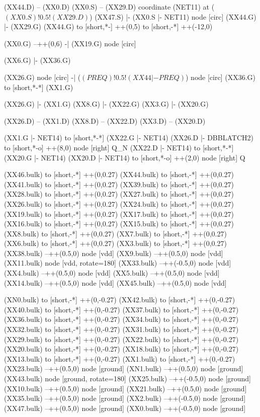 \begin{circuitikz}[american]
	(XX44.D) -- (XX0.D)
	(XX0.S) -- (XX29.D)
	coordinate (NET11) at ($(XX0.S)!0.5!(XX29.D)$)
	(XX47.S) |- (XX0.S |- NET11) node [circ] {}
	(XX44.G) |- (XX29.G)
	(XX44.G) to [short,*-] ++(0,5) to [short,-*] ++(-12,0)
	
	(XX0.G) --++(0,6) -| (XX19.G) node [circ] {}
	
	(XX6.G) |- (XX36.G)
	
	(XX26.G) node [circ] {} -| ($(PREQ)!0.5!(XX44 |- PREQ)$) node [circ] {}
	(XX36.G) to [short,*-*] (XX1.G)	
	
	(XX26.G) |- (XX1.G)
	(XX8.G) |- (XX22.G)
	(XX3.G) |- (XX20.G)
	
	(XX26.D) -- (XX1.D)
	(XX8.D) -- (XX22.D)
	(XX3.D) -- (XX20.D)
	
	(XX1.G |- NET14) to [short,*-*] (XX22.G |- NET14)
	(XX26.D |- DBBLATCH2) to [short,*-o] ++(8,0) node [right] {Q\_N}
	(XX22.D |- NET14) to [short,*-*] (XX20.G |- NET14)
	(XX20.D |- NET14) to [short,*-o] ++(2,0) node [right] {Q}
	
	(XX46.bulk) to [short,-*] ++(0,0.27)
	(XX44.bulk) to [short,-*] ++(0,0.27)
	(XX41.bulk) to [short,-*] ++(0,0.27)
	(XX39.bulk) to [short,-*] ++(0,0.27)
	(XX28.bulk) to [short,-*] ++(0,0.27)
	(XX27.bulk) to [short,-*] ++(0,0.27)
	(XX26.bulk) to [short,-*] ++(0,0.27)
	(XX24.bulk) to [short,-*] ++(0,0.27)
	(XX19.bulk) to [short,-*] ++(0,0.27)
	(XX17.bulk) to [short,-*] ++(0,0.27)
	(XX16.bulk) to [short,-*] ++(0,0.27)
	(XX15.bulk) to [short,-*] ++(0,0.27)
	(XX8.bulk) to [short,-*] ++(0,0.27)
	(XX7.bulk) to [short,-*] ++(0,0.27)
	(XX6.bulk) to [short,-*] ++(0,0.27)
	(XX3.bulk) to [short,-*] ++(0,0.27)
	(XX38.bulk) --++(0.5,0) node [vdd] {}
	(XX9.bulk) --++(0.5,0) node [vdd] {}
	(XX11.bulk) node [vdd, rotate=180] {}
	(XX33.bulk) --++(-0.5,0) node [vdd] {}
	(XX4.bulk) --++(0.5,0) node [vdd] {}
	(XX5.bulk) --++(0.5,0) node [vdd] {}
	(XX14.bulk) --++(0.5,0) node [vdd] {}
	(XX45.bulk) --++(0.5,0) node [vdd] {}
	
	(XN0.bulk) to [short,-*] ++(0,-0.27)
	(XX42.bulk) to [short,-*] ++(0,-0.27)
	(XX40.bulk) to [short,-*] ++(0,-0.27)
	(XX37.bulk) to [short,-*] ++(0,-0.27)
	(XX36.bulk) to [short,-*] ++(0,-0.27)
	(XX34.bulk) to [short,-*] ++(0,-0.27)
	(XX32.bulk) to [short,-*] ++(0,-0.27)
	(XX31.bulk) to [short,-*] ++(0,-0.27)
	(XX29.bulk) to [short,-*] ++(0,-0.27)
	(XX22.bulk) to [short,-*] ++(0,-0.27)
	(XX20.bulk) to [short,-*] ++(0,-0.27)
	(XX18.bulk) to [short,-*] ++(0,-0.27)
	(XX13.bulk) to [short,-*] ++(0,-0.27)
	(XX1.bulk) to [short,-*] ++(0,-0.27)
	(XX23.bulk) --++(0.5,0) node [ground] {}
	(XN1.bulk) --++(0.5,0) node [ground] {}
	(XX43.bulk) node [ground, rotate=180] {}
	(XX25.bulk) --++(-0.5,0) node [ground] {}
	(XX10.bulk) --++(0.5,0) node [ground] {}
	(XX21.bulk) --++(0.5,0) node [ground] {}
	(XX35.bulk) --++(0.5,0) node [ground] {}
	(XX2.bulk) --++(-0.5,0) node [ground] {}
	(XX47.bulk) --++(0.5,0) node [ground] {}
	(XX0.bulk) --++(-0.5,0) node [ground] {}


\end{circuitikz}
